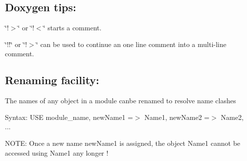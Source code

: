 \subsection*{Doxygen tips\-:}


\begin{DoxyItemize}
\item \char`\"{}!$>$\char`\"{} or \char`\"{}!$<$\char`\"{} starts a comment.
\item \char`\"{}!!\char`\"{} or \char`\"{}!$>$\char`\"{} can be used to continue an one line comment into a multi-\/line comment.
\end{DoxyItemize}

\subsection*{Renaming facility\-:}

The names of any object in a module canbe renamed to resolve name clashes
\begin{DoxyItemize}
\item Syntax\-: U\-S\-E module\-\_\-name, new\-Name1 =$>$ Name1, new\-Name2 =$>$ Name2, ...
\item N\-O\-T\-E\-: Once a new name new\-Name1 is assigned, the object Name1 cannot be accessed using Name1 any longer ! 
\end{DoxyItemize}